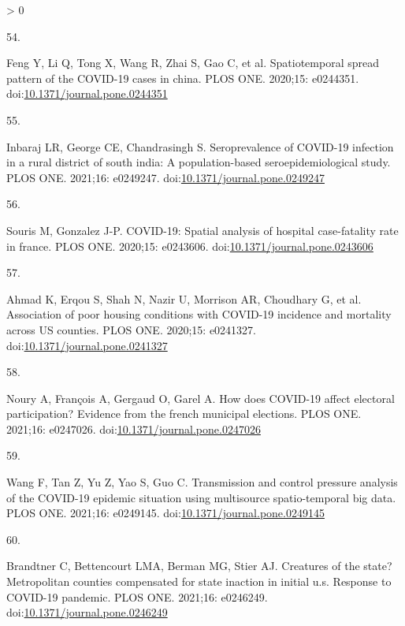 \documentclass[10pt,letterpaper]{article}
\newlength{\csllabelwidth}
\newlength{\cslhangindent}
\newenvironment{CSLReferences}[3] %
 {%
  \setlength{\parindent}{0pt}
  \ifodd #1 \everypar{\setlength{\hangindent}{\cslhangindent}}\ignorespaces\fi
  \ifnum #2 > 0
  \setlength{\parskip}{#2\baselineskip}
  \fi
 }%
 {}
\newcommand{\CSLLeftMargin}[1]{\parbox[t]{\csllabelwidth}{#1}}
\newcommand{\CSLRightInline}[1]{\parbox[t]{\linewidth - \csllabelwidth}{#1}}
\begin{document}
\begin{CSLReferences}{0}{0}
\leavevmode\hypertarget{ref-Feng2020spread}{}%
\CSLLeftMargin{54. }
\CSLRightInline{Feng Y, Li Q, Tong X, Wang R, Zhai S, Gao C, et al.
Spatiotemporal spread pattern of the COVID-19 cases in china. PLOS ONE.
2020;15: e0244351.
doi:\href{https://doi.org/10.1371/journal.pone.0244351}{10.1371/journal.pone.0244351}}

\leavevmode\hypertarget{ref-Inbaraj2021seroprevalence}{}%
\CSLLeftMargin{55. }
\CSLRightInline{Inbaraj LR, George CE, Chandrasingh S. Seroprevalence of
COVID-19 infection in a rural district of south india: A
population-based seroepidemiological study. PLOS ONE. 2021;16: e0249247.
doi:\href{https://doi.org/10.1371/journal.pone.0249247}{10.1371/journal.pone.0249247}}

\leavevmode\hypertarget{ref-Souris2020covid}{}%
\CSLLeftMargin{56. }
\CSLRightInline{Souris M, Gonzalez J-P. COVID-19: Spatial analysis of
hospital case-fatality rate in france. PLOS ONE. 2020;15: e0243606.
doi:\href{https://doi.org/10.1371/journal.pone.0243606}{10.1371/journal.pone.0243606}}

\leavevmode\hypertarget{ref-Ahmad2020association}{}%
\CSLLeftMargin{57. }
\CSLRightInline{Ahmad K, Erqou S, Shah N, Nazir U, Morrison AR,
Choudhary G, et al. Association of poor housing conditions with COVID-19
incidence and mortality across US counties. PLOS ONE. 2020;15: e0241327.
doi:\href{https://doi.org/10.1371/journal.pone.0241327}{10.1371/journal.pone.0241327}}

\leavevmode\hypertarget{ref-Noury2021how}{}%
\CSLLeftMargin{58. }
\CSLRightInline{Noury A, François A, Gergaud O, Garel A. How does
COVID-19 affect electoral participation? Evidence from the french
municipal elections. PLOS ONE. 2021;16: e0247026.
doi:\href{https://doi.org/10.1371/journal.pone.0247026}{10.1371/journal.pone.0247026}}

\leavevmode\hypertarget{ref-Wang2021transmission}{}%
\CSLLeftMargin{59. }
\CSLRightInline{Wang F, Tan Z, Yu Z, Yao S, Guo C. Transmission and
control pressure analysis of the COVID-19 epidemic situation using
multisource spatio-temporal big data. PLOS ONE. 2021;16: e0249145.
doi:\href{https://doi.org/10.1371/journal.pone.0249145}{10.1371/journal.pone.0249145}}

\leavevmode\hypertarget{ref-Brandtner2021creatures}{}%
\CSLLeftMargin{60. }
\CSLRightInline{Brandtner C, Bettencourt LMA, Berman MG, Stier AJ.
Creatures of the state? Metropolitan counties compensated for state
inaction in initial u.s. Response to COVID-19 pandemic. PLOS ONE.
2021;16: e0246249.
doi:\href{https://doi.org/10.1371/journal.pone.0246249}{10.1371/journal.pone.0246249}}


\end{CSLReferences}
\end{document}
